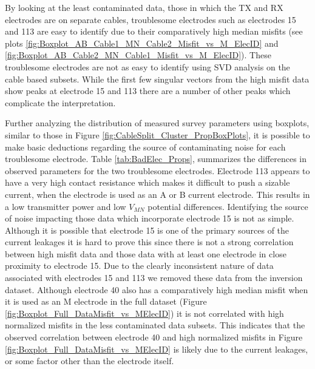 \documentclass[final,authoryear,5p,times,twocolumn]{elsarticle}
\begin{document}
By looking at the least contaminated data, those in which the TX and RX electrodes are on separate cables, troublesome electrodes such as electrodes 15 and 113 are easy to identify due to their comparatively high median misfits (see plots \ref{fig:Boxplot_AB_Cable1_MN_Cable2_Misfit_vs_M_ElecID} and \ref{fig:Boxplot_AB_Cable2_MN_Cable1_Misfit_vs_M_ElecID}). These troublesome electrodes are not as easy to identify using SVD analysis on the cable based subsets. While the first few singular vectors from the high misfit data show peaks at electrode 15 and 113 there are a number of other peaks which complicate the interpretation.

Further analyzing the distribution of measured survey parameters using boxplots, similar to those in Figure \ref{fig:CableSplit_Cluster_PropBoxPlots}, it is possible to make basic deductions regarding the source of contaminating noise for each troublesome electrode. Table \ref{tab:BadElec_Props}, summarizes the differences in observed parameters for the two troublesome electrodes. Electrode 113 appears to have a very high contact resistance which makes it difficult to push a sizable current, when the electrode is used as an A or B current electrode. This results in a low transmitter power and low $V_{MN}$ potential differences. Identifying the source of noise impacting those data which incorporate electrode 15 is not as simple. Although it is possible that electrode 15 is one of the primary sources of the current leakages it is hard to prove this since there is not a strong correlation between high misfit data and those data with at least one electrode in close proximity to electrode 15. Due to the clearly inconsistent nature of data associated with electrodes 15 and 113 we removed these data from the inversion dataset. Although electrode 40 also has a comparatively high median misfit when it is used as an M electrode in the full dataset (Figure \ref{fig:Boxplot_Full_DataMisfit_vs_MElecID}) it is not correlated with high normalized misfits in the less contaminated data subsets. This indicates that the observed correlation between electrode 40 and high normalized misfits in Figure \ref{fig:Boxplot_Full_DataMisfit_vs_MElecID} is likely due to the current leakages, or some factor other than the electrode itself.
\end{document}
